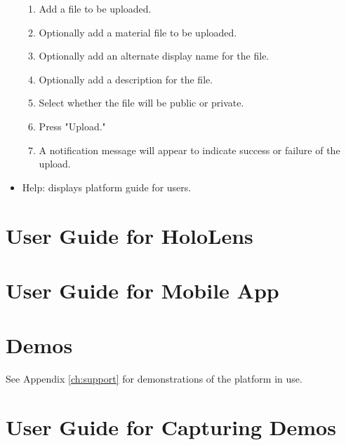\begin{itemize}
    \begin{enumerate}
        \item Add a file to be uploaded.  
        \item Optionally add a material file to be uploaded. 
        \item Optionally add an alternate display name for the file.
        \item Optionally add a description for the file.
        \item Select whether the file will be public or private.
        \item Press "Upload."
        \item A notification message will appear to indicate success or failure of the upload. 
    \end{enumerate}
    \item Help: displays platform guide for users. 
\end{itemize}

\section{User Guide for HoloLens}

\section{User Guide for Mobile App}

\section{Demos}

See Appendix \ref{ch:support} for demonstrations of the platform in use. 

\section{User Guide for Capturing Demos}

